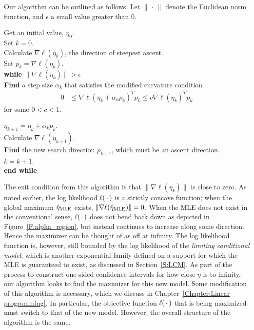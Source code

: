 
Our algorithm can be outlined as follows.  Let $\lVert \, \cdot \, \rVert$ denote the 
Euclidean norm function, and $\epsilon$ 
a small value greater than 0.  \\

{\singlespacing 
{\small  
\noindent Get an initial value, $\eta_0$.\\ 
Set $k=0$. \\
Calculate $\nabla \ell( \eta_k)$, the direction of steepest ascent. \\
Set $p_k = \nabla \ell( \eta_k)$. \\
\textbf{while}  $\lVert \nabla \ell( \eta_k) \rVert > \epsilon$ \\ 
\hspace{4mm} \indent	 \textbf{Find} a step size $\alpha_k$ that satisfies the modified 
curvature condition
\begin{align*}
	 0 & \leq \nabla \ell( \eta_k + \alpha_k p_k)^T p_k \leq c \nabla \ell(\eta_k)^T 
p_k
\end{align*}
\indent for some $0 < c < 1$.  


$\eta_{k+1} = \eta_k + \alpha_k p_k$.\\
\indent Calculate $\nabla \ell( \eta_{k+1})$.\\
\indent \textbf{Find} the new search direction $p_{k+1}$, which must be an ascent 
direction. \\
\indent $k = k + 1$.  \\
\textbf{end while}\\
}}
The exit condition from this algorithm is that $\lVert \nabla \ell( \eta_k) \rVert$
is close to zero.  As noted earlier, the log likelihood $\ell(\,\cdot\,)$ is a strictly
concave function; when the global maximum $\hat{\eta}_{\textrm{MLE}}$ exists, $\lVert \nabla \ell( \hat{\eta}_{\textrm{MLE}}) \rVert = 0$.  
When the MLE does not exist in the conventional sense, $\ell(\,\cdot\,)$ does not bend
 back down as depicted in Figure~\ref{F:alpha_region}, but instead continues to increase along some direction.  Hence the maximizer can be thought of as off at infinity.
The log likelihood function is, however, still bounded by 
the log likelihood of 
the \emph{limiting conditional model}, which 
is another exponential family defined on a support for which the MLE is
guaranteed to exist, as discussed in Section~\ref{S:LCM}.
As part of the process to construct one-sided confidence intervals 
for how close $\eta$ is to infinity, 
our algorithm looks to find the maximizer for this new model.  
Some modification of this algorithm is necessary, which we discuss in 
Chapter~\ref{Chapter:Linear programming}.  In particular, the objective function
$\ell( \,\cdot\,)$ that is being maximized must switch to that of the new model.
However, the overall structure of the algorithm is the same.

